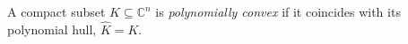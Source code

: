 
A compact subset $K\subseteq\mathbb C^n$ is \emph{polynomially convex} if it coincides with its polynomial hull, $\widehat K=K$.
